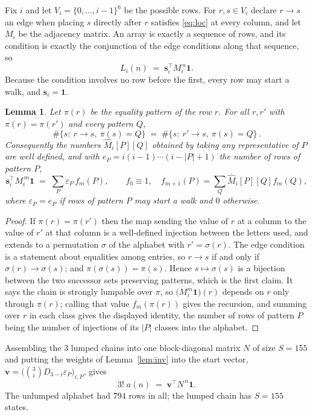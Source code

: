\documentclass[11pt,a4paper]{article}
\theoremstyle{plain}
\newtheorem{lemma}[theorem]{Lemma}
\theoremstyle{definition}
\begin{document}
Fix $i$ and let $V_i=\{0,\dots,i-1\}^{6}$ be the possible rows. For $r,s\in V_i$
declare $r\to s$ an edge when placing $s$ directly after $r$ satisfies \eqref{eq:loc} at
every column, and let $M_i$ be the adjacency matrix. An array is exactly a sequence of
rows, and its condition is exactly the conjunction of the edge conditions along that
sequence, so
\[
L_i(n)\;=\;\mathbf{s}_i^{\!\top}M_i^{\,n}\mathbf{1} .
\]
Because the condition involves no row before the first, every
row may start a walk, and $\mathbf{s}_i=\mathbf{1}$.

\begin{lemma}\label{lem:lump}
Let $\pi(r)$ be the equality pattern of the row $r$. For all $r,r'$ with
$\pi(r)=\pi(r')$ and every pattern $Q$,
\[
\#\{s:\ r\to s,\ \pi(s)=Q\}\;=\;\#\{s:\ r'\to s,\ \pi(s)=Q\}\, .
\]
Consequently the numbers $\widehat M_i[P][Q]$ obtained by taking any representative of $P$
are well defined, and with $e_P=i(i-1)\cdots(i-|P|+1)$ the number of rows of pattern $P$,
\[
\mathbf{s}_i^{\!\top}M_i^{\,m}\mathbf{1}\;=\;\sum_P \varepsilon_P\,f_m(P),
\qquad f_0\equiv1,\quad f_{m+1}(P)=\sum_Q\widehat M_i[P][Q]f_m(Q),
\]
where $\varepsilon_P=e_P$ if rows of pattern $P$ may start a walk and $0$ otherwise.
\end{lemma}

\begin{proof}
If $\pi(r)=\pi(r')$ then the map sending the value of $r$ at a column to the value of $r'$
at that column is a well-defined injection between the letters used, and extends to a
permutation $\sigma$ of the alphabet with $r'=\sigma(r)$. The edge condition is a statement
about equalities among entries, so $r\to s$ if and only if $\sigma(r)\to\sigma(s)$; and
$\pi(\sigma(s))=\pi(s)$. Hence $s\mapsto\sigma(s)$ is a bijection between the two successor
sets preserving patterns, which is the first claim. It says the chain is strongly lumpable
over $\pi$, so $\bigl(M_i^{m}\mathbf{1}\bigr)(r)$ depends on $r$ only through $\pi(r)$;
calling that value $f_m(\pi(r))$ gives the recursion, and summing over $r$ in each class
gives the displayed identity, the number of rows of pattern $P$ being the number of
injections of its $|P|$ classes into the alphabet.
\end{proof}

Assembling the $3$ lumped chains into one block-diagonal matrix $N$ of size $S=155$ and
putting the weights of Lemma~\ref{lem:inv} into the start vector,
$\mathbf{v}=\bigl(\binom{3}{i}D_{3-i}\varepsilon_P\bigr)_{i,P}$, gives
\begin{equation}\label{eq:walk}
3!\;a(n)\;=\;\mathbf{v}^{\!\top}N^{\,n}\mathbf{1} .
\end{equation}
The unlumped alphabet had $794$ rows in all; the lumped chain has $S=155$ states.
\end{document}
